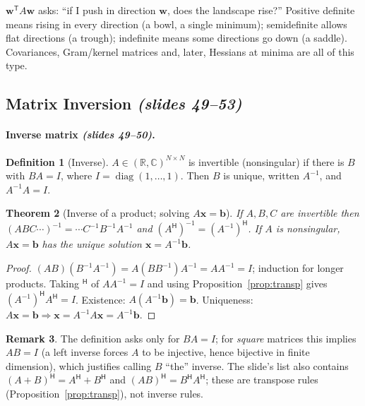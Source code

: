 \documentclass[11pt,a4paper]{article}
\newcommand{\R}{\mathbb{R}}
\newcommand{\C}{\mathbb{C}}
\newcommand{\T}{^{\mathsf{T}}}
\newcommand{\Her}{^{\mathsf{H}}}
\newcommand{\diag}{\operatorname{diag}}
\newcommand{\slides}[1]{\texorpdfstring{\emph{(slides #1)}}{(slides #1)}}
\theoremstyle{definition}
\newtheorem{definition}{Definition}[section]
\newtheorem{remark}[definition]{Remark}
\theoremstyle{plain}
\newtheorem{theorem}[definition]{Theorem}
\begin{document}
\begin{intuition}
$\mathbf w\T A\mathbf w$ asks: ``if I push in direction $\mathbf w$, does the landscape rise?'' Positive definite means rising in every direction (a bowl, a single minimum); semidefinite allows flat directions (a trough); indefinite means some directions go down (a saddle). Covariances, Gram/kernel matrices and, later, Hessians at minima are all of this type.
\end{intuition}

\subsection{Matrix Inversion \slides{49--53}}\label{sec:inv}

\paragraph{Inverse matrix \slides{49--50}.}
\begin{definition}[Inverse]
$A\in(\R,\C)^{N\times N}$ is invertible (nonsingular) if there is $B$ with $BA=I$, where $I=\diag(1,\dots,1)$. Then $B$ is unique, written $A^{-1}$, and $A^{-1}A=I$.
\end{definition}

\begin{theorem}[Inverse of a product; solving $A\mathbf x=\mathbf b$]\label{thm:inv}
If $A,B,C$ are invertible then $(ABC\cdots)^{-1}=\cdots C^{-1}B^{-1}A^{-1}$ and $(A\Her)^{-1}=(A^{-1})\Her$. If $A$ is nonsingular, $A\mathbf x=\mathbf b$ has the unique solution $\mathbf x=A^{-1}\mathbf b$.
\end{theorem}
\begin{proof}
$(AB)(B^{-1}A^{-1})=A(BB^{-1})A^{-1}=AA^{-1}=I$; induction for longer products. Taking $\Her$ of $AA^{-1}=I$ and using Proposition~\ref{prop:transp} gives $(A^{-1})\Her A\Her=I$. Existence: $A(A^{-1}\mathbf b)=\mathbf b$. Uniqueness: $A\mathbf x=\mathbf b\Rightarrow\mathbf x=A^{-1}A\mathbf x=A^{-1}\mathbf b$.
\end{proof}

\begin{remark}
The definition asks only for $BA=I$; for \emph{square} matrices this implies $AB=I$ (a left inverse forces $A$ to be injective, hence bijective in finite dimension), which justifies calling $B$ ``the'' inverse. The slide's list also contains $(A+B)\Her=A\Her+B\Her$ and $(AB)\Her=B\Her A\Her$; these are transpose rules (Proposition~\ref{prop:transp}), not inverse rules.
\end{remark}
\end{document}
